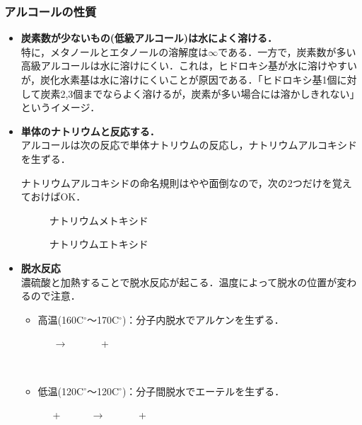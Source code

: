 \documentclass[a4paper,12pt]{ltjsreport}
\begin{document}
\subsubsection*{アルコールの性質}
\begin{itemize}
    \item\textbf{ 炭素数が少ないもの(低級アルコール)は水によく溶ける．}\\
    特に，メタノールとエタノールの溶解度は$\infty$である．一方で，炭素数が多い高級アルコールは水に溶けにくい．これは，ヒドロキシ基が水に溶けやすいが，炭化水素基は水に溶けにくいことが原因である．「ヒドロキシ基1個に対して炭素2,3個までならよく溶けるが，炭素が多い場合には溶かしきれない」というイメージ．
    \item\textbf{単体のナトリウムと反応する．}\\
    アルコールは次の反応で単体ナトリウムの反応し，ナトリウムアルコキシドを生ずる．
    {\centerline{}}
    ナトリウムアルコキシドの命名規則はやや面倒なので，次の2つだけを覚えておけばOK．\\\noindent
    \begin{minipage}{0.5\linewidth}
\begin{figure}[H]
\centering
{}
\caption{ナトリウムメトキシド}
\end{figure}

\end{minipage}
\begin{minipage}{0.5\linewidth}
\begin{figure}[H]
\centering
{}
\caption{ナトリウムエトキシド}
\end{figure}

\end{minipage}
\item \textbf{脱水反応}\\
濃硫酸と加熱することで脱水反応が起こる．温度によって脱水の位置が変わるので注意．
\begin{itemize}
    \item 高温(160C$^\circ$〜170C$^\circ$)：分子内脱水でアルケンを生ずる．\\[5pt]
    \centerline{
    ~~~$\longrightarrow$~~~ ~~~+~~~}\\
    \item  低温(120C$^\circ$〜120C$^\circ$)：分子間脱水でエーテルを生ずる．\\
    \centerline{
    ~~~+~~~~~~$\longrightarrow$~~~ ~~~+~~~}
\end{itemize}
\end{itemize}
\newpage
\end{document}
